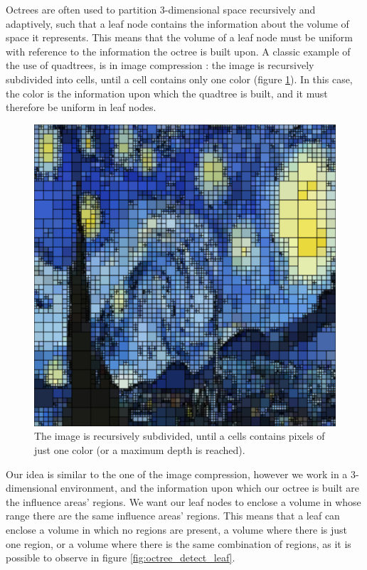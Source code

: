 \documentclass{PoliMi_MasterThesis}
\begin{document}
Octrees are often used to partition 3-dimensional space recursively and adaptively, such that a leaf node contains the information about the volume of space it represents. This means that the volume of a leaf node must be uniform with reference to the information the octree is built upon. A classic example of the use of quadtrees, is in image compression \cite{TODO}: the image is recursively subdivided into cells, until a cell contains only one color (figure \ref{fig:quadtree_for_compression}). In this case, the color is the information upon which the quadtree is built, and it must therefore be uniform in leaf nodes.

\begin{figure}[H]
	\centering
	\includegraphics[width=\textwidth*\real{0.65}]{Images/quadtree_for_compression.png}
	\caption{The image is recursively subdivided, until a cells contains pixels of just one color (or a maximum depth is reached).}
	\label{fig:quadtree_for_compression}
\end{figure}

Our idea is similar to the one of the image compression, however we work in a 3-dimensional environment, and the information upon which our octree is built are the influence areas' regions. We want our leaf nodes to enclose a volume in whose range there are the same influence areas' regions. This means that a leaf can enclose a volume in which no regions are present, a volume where there is just one region, or a volume where there is the same combination of regions, as it is possible to observe in figure \ref{fig:octree_detect_leaf}.
\end{document}
